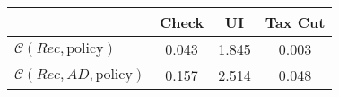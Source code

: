 \begin{tabular}{@{}lccc@{}} 
\toprule 
                          & Check      & UI    & Tax Cut    \\  \midrule 
$\mathcal{C}(Rec,\text{policy})$ & 0.043  & 1.845  & 0.003     \\ 
$\mathcal{C}(Rec, AD,\text{policy})$ & 0.157  & 2.514  & 0.048     \\ 
\end{tabular}  
